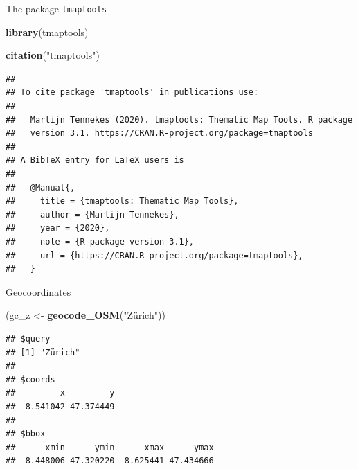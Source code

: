 \documentclass[
  ignorenonframetext,
]{beamer}
\newenvironment{Shaded}{\begin{snugshade}}{\end{snugshade}}
\newcommand{\KeywordTok}[1]{\textcolor[rgb]{0.13,0.29,0.53}{\textbf{#1}}}
\newcommand{\NormalTok}[1]{#1}
\newcommand{\StringTok}[1]{\textcolor[rgb]{0.31,0.60,0.02}{#1}}
\begin{document}
\begin{frame}[fragile]{The package \texttt{tmaptools}}
\protect\hypertarget{the-package-tmaptools}{}
\begin{Shaded}
\begin{Highlighting}[]
\KeywordTok{library}\NormalTok{(tmaptools)}
\end{Highlighting}
\end{Shaded}

\begin{Shaded}
\begin{Highlighting}[]
\KeywordTok{citation}\NormalTok{(}\StringTok{"tmaptools"}\NormalTok{)}
\end{Highlighting}
\end{Shaded}

\begin{verbatim}
## 
## To cite package 'tmaptools' in publications use:
## 
##   Martijn Tennekes (2020). tmaptools: Thematic Map Tools. R package
##   version 3.1. https://CRAN.R-project.org/package=tmaptools
## 
## A BibTeX entry for LaTeX users is
## 
##   @Manual{,
##     title = {tmaptools: Thematic Map Tools},
##     author = {Martijn Tennekes},
##     year = {2020},
##     note = {R package version 3.1},
##     url = {https://CRAN.R-project.org/package=tmaptools},
##   }
\end{verbatim}
\end{frame}

\begin{frame}[fragile]{Geocoordinates}
\protect\hypertarget{geocoordinates}{}
\begin{Shaded}
\begin{Highlighting}[]
\NormalTok{(gc\_z \textless{}{-}}\StringTok{ }\KeywordTok{geocode\_OSM}\NormalTok{(}\StringTok{"Zürich"}\NormalTok{))}
\end{Highlighting}
\end{Shaded}

\begin{verbatim}
## $query
## [1] "Zürich"
## 
## $coords
##         x         y 
##  8.541042 47.374449 
## 
## $bbox
##      xmin      ymin      xmax      ymax 
##  8.448006 47.320220  8.625441 47.434666
\end{verbatim}
\end{frame}
\end{document}
